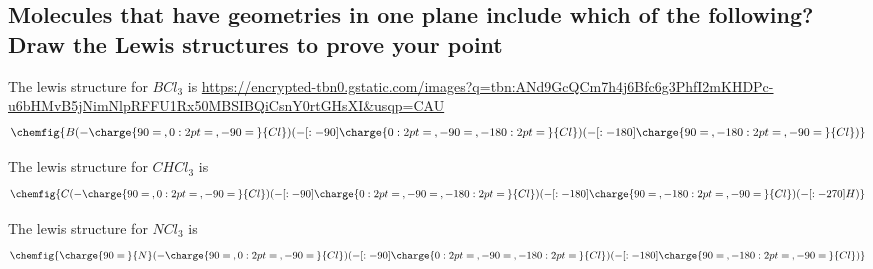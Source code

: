 \documentclass[11pt]{article}
\begin{document}
\subsection{Molecules that have geometries in one plane include which of the following? Draw the Lewis structures to prove your point}
\label{sec:org3762890}
The lewis structure for \(BCl_3\) is
\url{https://encrypted-tbn0.gstatic.com/images?q=tbn:ANd9GcQCm7h4j6Bfc6g3PhfI2mKHDPc-u6bHMvB5jNimNlpRFFU1Rx50MBSIBQiCsnY0rtGHsXI\&usqp=CAU}
\begin{align}
\chemfig{{B}(-\charge{90=\:, 0:2pt=\:, -90=\:}{Cl})(-[:-90]\charge{0:2pt=\:, -90=\:, -180:2pt=\:}{Cl})(-[:-180]\charge{90=\:, -180:2pt=\:, -90=\:}{Cl})}
\end{align}

The lewis structure for \(CHCl_3\) is
\begin{align}
\chemfig{{C}(-\charge{90=\:, 0:2pt=\:, -90=\:}{Cl})(-[:-90]\charge{0:2pt=\:, -90=\:, -180:2pt=\:}{Cl})(-[:-180]\charge{90=\:, -180:2pt=\:, -90=\:}{Cl})(-[:-270]{H})}
\end{align}

The lewis structure for \(NCl_3\) is
\begin{align}
\chemfig{\charge{90=\:}{N}(-\charge{90=\:, 0:2pt=\:, -90=\:}{Cl})(-[:-90]\charge{0:2pt=\:, -90=\:, -180:2pt=\:}{Cl})(-[:-180]\charge{90=\:, -180:2pt=\:, -90=\:}{Cl})}
\end{align}
\end{document}
